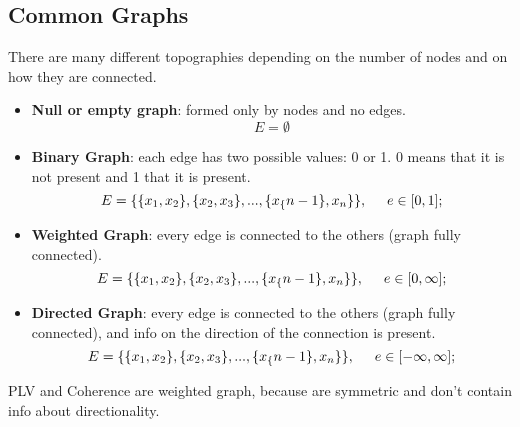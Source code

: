 \subsection{Common Graphs}
There are many different topographies depending on the number of nodes and on how they are connected. 
\begin{figure}[H]
    \centering
\end{figure}
\begin{itemize}
    \item \textbf{Null or empty graph}: formed only by nodes and no edges.
    \begin{equation*}
        E=\emptyset
    \end{equation*}
    \item \textbf{Binary Graph}: each edge has two possible values: 0 or 1. 0 means that it is not present and 1 that it is present.
    \begin{equation*}
        E=\{\{x_1, x_2\}, \{x_2,x_3\},..., \{x_\{n-1\},x_n\}\},\hspace{0.5cm}e\in[0,1];
    \end{equation*}
    \item \textbf{Weighted Graph}: every edge is connected to the others (graph fully connected).
    \begin{equation*}
        E=\{\{x_1, x_2\}, \{x_2,x_3\},..., \{x_\{n-1\},x_n\}\},\hspace{0.5cm}e\in[0,\infty];
    \end{equation*}
    \item \textbf{Directed Graph}: every edge is connected to the others (graph fully connected), and info on the direction of the connection is present.
    \begin{equation*}
        E=\{\{x_1, x_2\}, \{x_2,x_3\},..., \{x_\{n-1\},x_n\}\},\hspace{0.5cm}e\in[-\infty,\infty];
    \end{equation*}
\end{itemize}
PLV and Coherence are weighted graph, because are symmetric and don't contain info about directionality.
